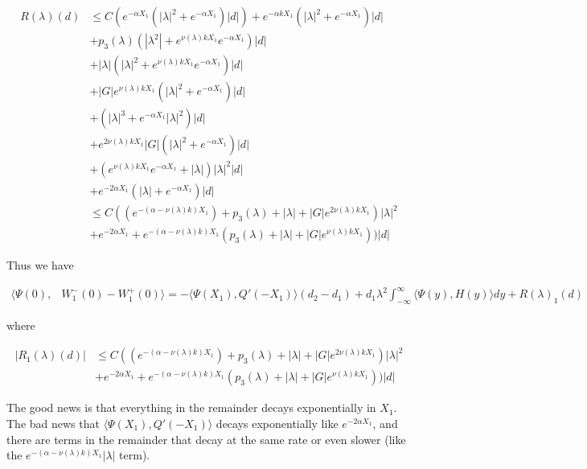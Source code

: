 \documentclass[12pt]{article}
\begin{document}
\begin{enumerate}
\begin{align*}
R(\lambda)(d) &\leq C( e^{-\alpha X_1}( |\lambda|^2 + e^{-\alpha X_1})|d|) + e^{-\alpha k X_1} ( |\lambda|^2 + e^{-\alpha X_1}) |d| \\
&+ p_3(\lambda) (|\lambda^2| + e^{\nu(\lambda)k X_1}e^{-\alpha X_1})|d| \\
&+ |\lambda| (|\lambda|^2 + e^{\nu(\lambda)k X_1} e^{-\alpha X_1})|d| \\
&+ |G| e^{\nu(\lambda)k X_1} ( |\lambda|^2 + e^{-\alpha X_1} )|d| \\ 
&+ (|\lambda|^3 + e^{-\alpha X_1} |\lambda|^2 )|d| \\
&+ e^{2 \nu(\lambda) k X_1} |G| ( |\lambda|^2 + e^{-\alpha X_1} )|d| \\
&+ (e^{\nu(\lambda)k X_1} e^{-\alpha X_1} + |\lambda|)|\lambda|^2|d|\\
&+ e^{-2 \alpha X_1} \left( |\lambda| +  e^{-\alpha X_1}  \right) |d|\\
&\leq C( ( e^{-(\alpha - \nu(\lambda) k)X_1 }) + p_3(\lambda) + |\lambda| + |G|e^{2 \nu(\lambda) k X_1})|\lambda|^2 \\ 
&+ e^{-2 \alpha X_1} + e^{-(\alpha - \nu(\lambda) k)X_1 }(p_3(\lambda) + |\lambda| + |G| e^{\nu(\lambda)k X_1}))|d|
\end{align*}

Thus we have 

\begin{align*}
\langle \Psi(0), &W_1^-(0) - W_1^+(0) \rangle = 
-\langle \Psi(X_1), Q'(-X_1) \rangle (d_2 - d_1 ) + d_1 \lambda^2 \int_{-\infty}^\infty \langle \Psi(y), H(y) \rangle dy + R(\lambda)_1(d)
\end{align*}

where 

\begin{align*}
|R_1(\lambda)(d)| &\leq C( ( e^{-(\alpha - \nu(\lambda) k)X_1 }) + p_3(\lambda) + |\lambda| + |G|e^{2 \nu(\lambda) k X_1})|\lambda|^2 \\ 
&+ e^{-2 \alpha X_1} + e^{-(\alpha - \nu(\lambda) k)X_1 }(p_3(\lambda) + |\lambda| + |G| e^{\nu(\lambda)k X_1}))|d|
\end{align*}

The good news is that everything in the remainder decays exponentially in $X_1$. The bad news that $\langle \Psi(X_1), Q'(-X_1) \rangle$ decays exponentially like $e^{-2 \alpha X_1}$, and there are terms in the remainder that decay at the same rate or even slower (like the $e^{-(\alpha - \nu(\lambda) k)X_1 } |\lambda|$ term).


\end{enumerate}
\end{document}
